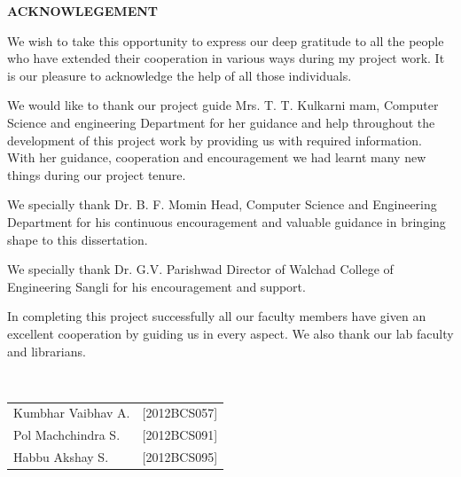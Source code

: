 \documentclass{article}
\begin{document}
\linespread{1.3}
\newpage
\setlength{\parskip}{.2cm}
\begin{center}
{\LARGE \textbf{ ACKNOWLEGEMENT}}\\[1cm]
\end{center}
{\normalsize
	\par We wish to take this opportunity to express our deep gratitude to all the people who have 
extended their cooperation in various ways during my project work. It is our pleasure to acknowledge 
the help of all those individuals. 
	\par We would like to thank our project guide Mrs. T. T. Kulkarni mam, Computer Science and 
engineering Department for her guidance and help throughout the development of this project work 
by providing us with required information. With her guidance, cooperation and encouragement we 
had learnt many new things during our project tenure. 
	\par We specially thank Dr. B. F. Momin Head, Computer Science and Engineering Department for 
his continuous encouragement and valuable guidance in bringing shape to this dissertation. 
	\par  We specially thank Dr. G.V. Parishwad Director of Walchad College of Engineering Sangli for 
his encouragement and support.  
	\par In completing this project successfully all our faculty members have given an excellent 
cooperation by guiding us in every aspect. We also thank our lab faculty and librarians.
}\\[1cm]\par 
\vspace{3cm}
\begin{center}
\begin{minipage}{.5\linewidth}

\begin{tabular}{lr}
	\large Kumbhar Vaibhav A. &\large [2012BCS057]\\
	\large Pol Machchindra  S. &\large [2012BCS091] \\
	\large Habbu Akshay S. &\large [2012BCS095]\\
\end{tabular}
\end{minipage}
\end{center}
\end{document}
